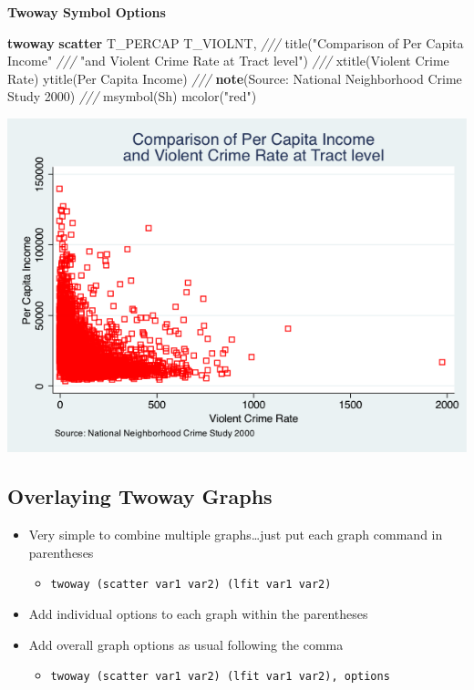 \documentclass[]{book}
\newenvironment{Shaded}{\begin{snugshade}}{\end{snugshade}}
\newcommand{\BaseNTok}[1]{\textcolor[rgb]{0.00,0.00,0.81}{#1}}
\newcommand{\CommentTok}[1]{\textcolor[rgb]{0.56,0.35,0.01}{\textit{#1}}}
\newcommand{\KeywordTok}[1]{\textcolor[rgb]{0.13,0.29,0.53}{\textbf{#1}}}
\newcommand{\NormalTok}[1]{#1}
\newcommand{\StringTok}[1]{\textcolor[rgb]{0.31,0.60,0.02}{#1}}
\providecommand{\tightlist}{%
  \setlength{\itemsep}{0pt}\setlength{\parskip}{0pt}}
\begin{document}
\textbf{Twoway Symbol Options}

\begin{Shaded}
\begin{Highlighting}[]
  \KeywordTok{twoway} \KeywordTok{scatter}\NormalTok{ T_PERCAP T_VIOLNT, }\CommentTok{///}
      \BaseNTok{title}\NormalTok{(}\StringTok{"Comparison of Per Capita Income"} \CommentTok{///}
  \StringTok{"and Violent Crime Rate at Tract level"}\NormalTok{) }\CommentTok{///}
  \BaseNTok{xtitle}\NormalTok{(Violent Crime Rate) }\BaseNTok{ytitle}\NormalTok{(Per Capita Income) }\CommentTok{///}
  \KeywordTok{note}\NormalTok{(Source: National Neighborhood Crime Study 2000) }\CommentTok{///}
  \BaseNTok{msymbol}\NormalTok{(Sh) mcolor(}\StringTok{"red"}\NormalTok{)}
\end{Highlighting}
\end{Shaded}

\includegraphics{Stata/StataModGraph/images/msymbol_mcolor.png}

\hypertarget{overlaying-twoway-graphs}{%
\subsection{Overlaying Twoway Graphs}\label{overlaying-twoway-graphs}}

\begin{itemize}
\tightlist
\item
  Very simple to combine multiple graphs\ldots just put each graph command in parentheses

  \begin{itemize}
  \tightlist
  \item
    \texttt{twoway\ (scatter\ var1\ var2)\ (lfit\ var1\ var2)}
  \end{itemize}
\item
  Add individual options to each graph within the parentheses
\item
  Add overall graph options as usual following the comma

  \begin{itemize}
  \tightlist
  \item
    \texttt{twoway\ (scatter\ var1\ var2)\ (lfit\ var1\ var2),\ options}
  \end{itemize}
\end{itemize}
\end{document}

